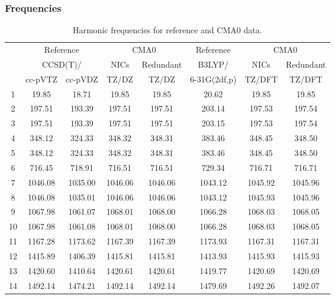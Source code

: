 \documentclass[10pt,oneside]{article}
\begin{document}
\begin{table}[h!]
\subsubsection*{Frequencies}
\centering
\caption{Harmonic frequencies for reference and CMA0 data.}
\begin{tabular}{cccccccc}
\toprule
{} & \multicolumn{2}{c}{Reference} & \multicolumn{2}{c}{CMA0} &    Reference & \multicolumn{2}{c}{CMA0} \\
{} & \multicolumn{2}{c}{CCSD(T)/} &    NICs &  Redundant &       B3LYP/ &    NICs & Redundant \\
{} &   cc-pVTZ & cc-pVDZ &   TZ/DZ &      TZ/DZ & 6-31G(2df,p) &  TZ/DFT &    TZ/DFT \\
\midrule
1  &     19.85 &   18.71 &   19.85 &      19.85 &        20.62 &   19.85 &     19.85 \\
2  &    197.51 &  193.39 &  197.51 &     197.51 &       203.14 &  197.53 &    197.54 \\
3  &    197.51 &  193.39 &  197.51 &     197.51 &       203.15 &  197.53 &    197.54 \\
4  &    348.12 &  324.33 &  348.32 &     348.31 &       383.46 &  348.45 &    348.50 \\
5  &    348.12 &  324.33 &  348.32 &     348.31 &       383.46 &  348.45 &    348.50 \\
6  &    716.45 &  718.91 &  716.51 &     716.51 &       729.34 &  716.71 &    716.71 \\
7  &   1046.08 & 1035.00 & 1046.06 &    1046.06 &      1043.12 & 1045.92 &   1045.96 \\
8  &   1046.08 & 1035.01 & 1046.06 &    1046.06 &      1043.12 & 1045.93 &   1045.96 \\
9  &   1067.98 & 1061.07 & 1068.01 &    1068.00 &      1066.28 & 1068.03 &   1068.05 \\
10 &   1067.98 & 1061.08 & 1068.01 &    1068.00 &      1066.28 & 1068.03 &   1068.05 \\
11 &   1167.28 & 1173.62 & 1167.39 &    1167.39 &      1173.93 & 1167.31 &   1167.31 \\
12 &   1415.89 & 1406.39 & 1415.81 &    1415.81 &      1413.93 & 1415.93 &   1415.93 \\
13 &   1420.60 & 1410.64 & 1420.61 &    1420.61 &      1419.77 & 1420.69 &   1420.69 \\
14 &   1492.14 & 1474.21 & 1492.14 &    1492.14 &      1479.69 & 1492.26 &   1492.07 \\

\end{tabular}
\end{table}
\end{document}
